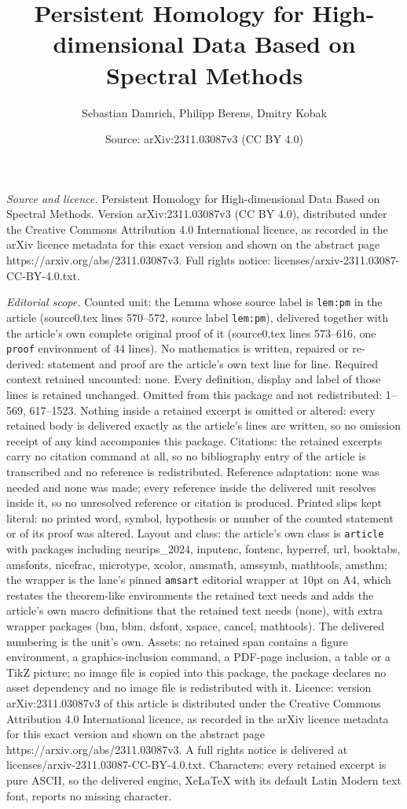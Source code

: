 \documentclass[10pt,a4paper]{amsart}
\title[Persistent Homology for High-dimensional Data Based on Spect]{Persistent Homology for High-dimensional Data Based on Spectral Methods}
\author{Sebastian Damrich, Philipp Berens, Dmitry Kobak}
\date{Source: arXiv:2311.03087v3 (CC BY 4.0)}
\begin{document}
\maketitle

\noindent\emph{Source and licence.} Persistent Homology for High-dimensional Data Based on Spectral Methods. Version arXiv:2311.03087v3 (CC BY 4.0), distributed under the Creative Commons Attribution 4.0 International licence, as recorded in the arXiv licence metadata for this exact version and shown on the abstract page https://arxiv.org/abs/2311.03087v3. Full rights notice: licenses/arxiv-2311.03087-CC-BY-4.0.txt.\par\smallskip

\noindent\textit{Editorial scope.} Counted unit: the Lemma whose source label is \texttt{lem:pm} in the article (source0.tex lines 570--572, source label \texttt{lem:pm}), delivered together with the article's own complete original proof of it (source0.tex lines 573--616, one \texttt{proof} environment of 44 lines). No mathematics is written, repaired or re-derived: statement and proof are the article's own text line for line. Required context retained uncounted: none. Every definition, display and label of those lines is retained unchanged. Omitted from this package and not redistributed: 1--569, 617--1523. Nothing inside a retained excerpt is omitted or altered: every retained body is delivered exactly as the article's lines are written, so no omission receipt of any kind accompanies this package. Citations: the retained excerpts carry no citation command at all, so no bibliography entry of the article is transcribed and no reference is redistributed. Reference adaptation: none was needed and none was made; every reference inside the delivered unit resolves inside it, so no unresolved reference or citation is produced. Printed slips kept literal: no printed word, symbol, hypothesis or number of the counted statement or of its proof was altered. Layout and class: the article's own class is \texttt{article} with packages including neurips\_2024, inputenc, fontenc, hyperref, url, booktabs, amsfonts, nicefrac, microtype, xcolor, amsmath, amssymb, mathtools, amsthm; the wrapper is the lane's pinned \texttt{amsart} editorial wrapper at 10pt on A4, which restates the theorem-like environments the retained text needs and adds the article's own macro definitions that the retained text needs (none), with extra wrapper packages (bm, bbm, dsfont, xspace, cancel, mathtools). The delivered numbering is the unit's own. Assets: no retained span contains a figure environment, a graphics-inclusion command, a PDF-page inclusion, a table or a TikZ picture; no image file is copied into this package, the package declares no asset dependency and no image file is redistributed with it. Licence: version arXiv:2311.03087v3 of this article is distributed under the Creative Commons Attribution 4.0 International licence, as recorded in the arXiv licence metadata for this exact version and shown on the abstract page https://arxiv.org/abs/2311.03087v3. A full rights notice is delivered at licenses/arxiv-2311.03087-CC-BY-4.0.txt. Characters: every retained excerpt is pure ASCII, so the delivered engine, XeLaTeX with its default Latin Modern text font, reports no missing character.
\end{document}
